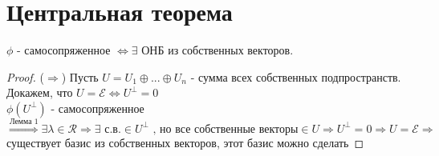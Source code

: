 \section{Центральная теорема}
$\phi$ - самосопряженное $\Leftrightarrow \exists
$ ОНБ из собственных векторов.
\begin{proof}
	($\Rightarrow$) Пусть $U=U_1 \oplus ... \oplus U_n$ - сумма всех собственных подпространств. Докажем, что $U= \mathcal{E} \Leftrightarrow U^\perp = 0$ \\
	$\phi(U^\perp)$ - самосопряженное $	\overset{\text{Лемма 1}}{\Rightarrow}  \exists \lambda \in \mathcal{R} \Rightarrow \exists \text{~с.в.} \in U^\perp \text{~, но все собственные векторы} \in U \Rightarrow U^\perp = 0 \Rightarrow U = \mathcal{E} \Rightarrow$ существует базис из собственных векторов, этот базис можно сделать
\end{proof}